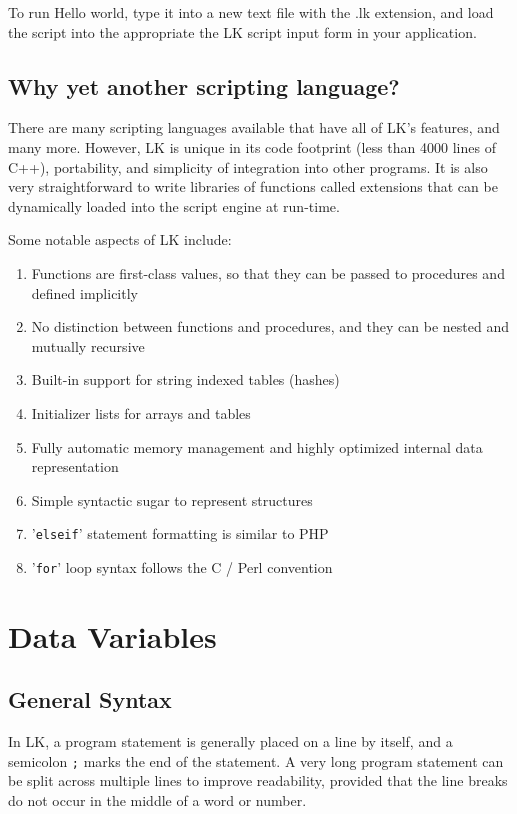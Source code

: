\documentclass{article}
\begin{document}
To run Hello world, type it into a new text file with the .lk extension, and load the script into the appropriate the LK script input form in your application.  

\subsection{Why yet another scripting language?}

There are many scripting languages available that have all of LK's features, and many more.  However, LK is unique in its code footprint (less than 4000 lines of C++), portability, and simplicity of integration into other programs.  It is also very straightforward to write libraries of functions called extensions that can be dynamically loaded into the script engine at run-time.

Some notable aspects of LK include:
\begin{enumerate}
\item Functions are first-class values, so that they can be passed to procedures and defined implicitly
\item No distinction between functions and procedures, and they can be nested and mutually recursive
\item Built-in support for string indexed tables (hashes)
\item Initializer lists for arrays and tables
\item Fully automatic memory management and highly optimized internal data representation
\item Simple syntactic sugar to represent structures
\item '\texttt{elseif}' statement formatting is similar to PHP
\item '\texttt{for}' loop syntax follows the C / Perl convention
\end{enumerate}

\section{Data Variables}

\subsection{General Syntax}
In LK, a program statement is generally placed on a line by itself, and a semicolon \texttt{;} marks the end of the statement.  A very long program statement can be split across multiple lines to improve readability, provided that the line breaks do not occur in the middle of a word or number.
\end{document}
